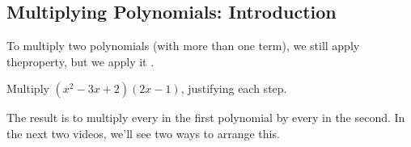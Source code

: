 \subsection{Multiplying Polynomials: Introduction} 
To multiply two polynomials (with more than one term), we still apply the\newline\makeblank[1in] property, but we apply it \makeblank[1in].
\begin{Example}Multiply $(x^2-3x+2)(2x-1)$, justifying each step.
\end{Example}
\noindent The result is to multiply every \makeblank[1.25in] in the first polynomial by every \makeblank[1.25in] in the second. In the next two videos, we'll see two ways to arrange this.